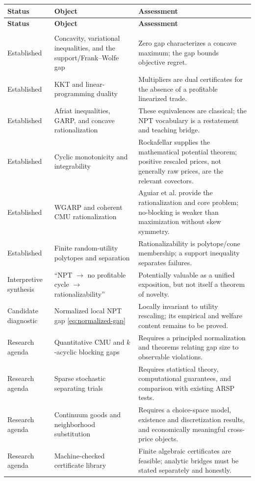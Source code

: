\documentclass[11pt]{article}
\theoremstyle{definition}
\theoremstyle{remark}
\begin{document}
\begingroup
\small
\begin{longtable}{>{\raggedright\arraybackslash}p{}
  >{\raggedright\arraybackslash}p{}
  >{\raggedright\arraybackslash}p{}}
\toprule
\textbf{Status} & \textbf{Object} & \textbf{Assessment}\\
\midrule
\endfirsthead
\toprule
\textbf{Status} & \textbf{Object} & \textbf{Assessment}\\
\midrule
\endhead
\midrule
\multicolumn{3}{r}{\footnotesize Continued on the next page}\\
\endfoot
\bottomrule
\endlastfoot
Established
& Concavity, variational inequalities, and the support/Frank--Wolfe gap
& Zero gap characterizes a concave maximum; the gap bounds objective regret.\\
\addlinespace
Established
& KKT and linear-programming duality
& Multipliers are dual certificates for the absence of a profitable linearized trade.\\
\addlinespace
Established
& Afriat inequalities, GARP, and concave rationalization
& These equivalences are classical; the NPT vocabulary is a restatement and teaching bridge.\\
\addlinespace
Established
& Cyclic monotonicity and integrability
& Rockafellar supplies the mathematical potential theorem; positive rescaled prices, not generally
raw prices, are the relevant covectors.\\
\addlinespace
Established
& WGARP and coherent CMU rationalization
& Aguiar et al. provide the rationalization and core problem; no-blocking is weaker than maximization
without skew symmetry.\\
\addlinespace
Established
& Finite random-utility polytopes and separation
& Rationalizability is polytope/cone membership; a support inequality separates failures.\\
\addlinespace
Interpretive synthesis
& ``NPT $\to$ no profitable cycle $\to$ rationalizability''
& Potentially valuable as a unified exposition, but not itself a theorem of novelty.\\
\addlinespace
Candidate diagnostic
& Normalized local NPT gap \eqref{eq:normalized-gap}
& Locally invariant to utility rescaling; its empirical and welfare content remains to be proved.\\
\addlinespace
Research agenda
& Quantitative CMU and $k$-acyclic blocking gaps
& Requires a principled normalization and theorems relating gap size to observable violations.\\
\addlinespace
Research agenda
& Sparse stochastic separating trials
& Requires statistical theory, computational guarantees, and comparison with existing ARSP tests.\\
\addlinespace
Research agenda
& Continuum goods and neighborhood substitution
& Requires a choice-space model, existence and discretization results, and economically meaningful
cross-price objects.\\
\addlinespace
Research agenda
& Machine-checked certificate library
& Finite algebraic certificates are feasible; analytic bridges must be stated separately and honestly.\\
\end{longtable}
\endgroup
\end{document}
